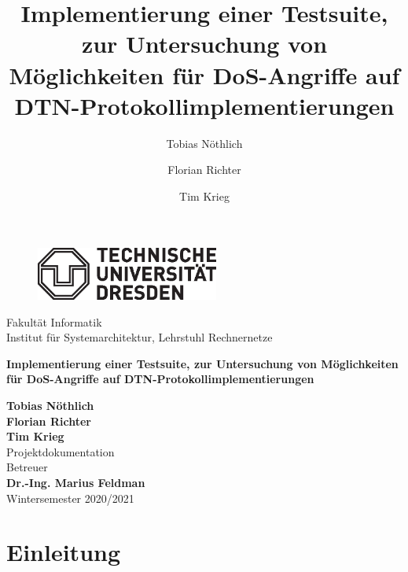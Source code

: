 \documentclass{article}
\author[1]{Tobias Nöthlich}
\author[1]{Florian Richter}
\author[1]{Tim Krieg}
\title{Implementierung einer Testsuite, zur Untersuchung von Möglichkeiten für DoS-Angriffe auf DTN-Protokollimplementierungen}
\begin{document}


\begin{titlepage}

\begin{figure}[h]
\begin{flushleft}
\includegraphics[trim= 0 0 0 0 , clip, width=6cm]{img/logo.eps} 
\end{flushleft}
\end{figure}
\noindent
Fakultät Informatik\\
Institut für Systemarchitektur, Lehrstuhl Rechnernetze \\

\begin{center}
\Huge
\textbf{Implementierung einer Testsuite, zur Untersuchung von Möglichkeiten für DoS-Angriffe auf DTN-Protokollimplementierungen} \\
\normalsize
\vspace{1cm}

\end{center}

\vspace{1cm}
\noindent
\textbf{\large{Tobias Nöthlich}} \\
\textbf{\large{Florian Richter}} \\
\textbf{\large{Tim Krieg}} \\

\vspace{1cm}
\noindent
{\LARGE Projektdokumentation} \\

\vspace{1cm}
\noindent
Betreuer\\
\textbf{\large{Dr.-Ing. Marius Feldman}} \\

\vspace{1cm}
\noindent
Wintersemester 2020/2021

\end{titlepage}
\tableofcontents

\newpage

\section{Einleitung}
\end{document}
